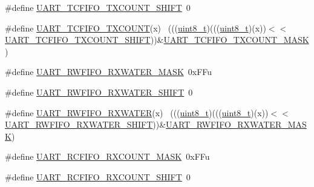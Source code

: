 \begin{DoxyCompactItemize}
\item 
\#define \hyperlink{group___u_a_r_t___register___masks_gaae504c1c6564913b0daeaf835defa8aa}{U\+A\+R\+T\+\_\+\+T\+C\+F\+I\+F\+O\+\_\+\+T\+X\+C\+O\+U\+N\+T\+\_\+\+S\+H\+I\+FT}~0
\item 
\#define \hyperlink{group___u_a_r_t___register___masks_ga127fff58218035fec1e2514fbf4aa920}{U\+A\+R\+T\+\_\+\+T\+C\+F\+I\+F\+O\+\_\+\+T\+X\+C\+O\+U\+NT}(x)                                  ~(((\hyperlink{_p_e___types_8h_aba7bc1797add20fe3efdf37ced1182c5}{uint8\+\_\+t})(((\hyperlink{_p_e___types_8h_aba7bc1797add20fe3efdf37ced1182c5}{uint8\+\_\+t})(x))$<$$<$\hyperlink{group___u_a_r_t___register___masks_gaae504c1c6564913b0daeaf835defa8aa}{U\+A\+R\+T\+\_\+\+T\+C\+F\+I\+F\+O\+\_\+\+T\+X\+C\+O\+U\+N\+T\+\_\+\+S\+H\+I\+FT}))\&\hyperlink{group___u_a_r_t___register___masks_gab3c6a27ca034de86ac2aa4f5c55781f2}{U\+A\+R\+T\+\_\+\+T\+C\+F\+I\+F\+O\+\_\+\+T\+X\+C\+O\+U\+N\+T\+\_\+\+M\+A\+SK})
\item 
\#define \hyperlink{group___u_a_r_t___register___masks_ga94cd69bba6b852fbd438b8b4b1ab1372}{U\+A\+R\+T\+\_\+\+R\+W\+F\+I\+F\+O\+\_\+\+R\+X\+W\+A\+T\+E\+R\+\_\+\+M\+A\+SK}~0x\+F\+Fu
\item 
\#define \hyperlink{group___u_a_r_t___register___masks_ga76a2717965f398da28aadbbebfafa2c8}{U\+A\+R\+T\+\_\+\+R\+W\+F\+I\+F\+O\+\_\+\+R\+X\+W\+A\+T\+E\+R\+\_\+\+S\+H\+I\+FT}~0
\item 
\#define \hyperlink{group___u_a_r_t___register___masks_ga3e9217bf32d7c1794d25f5ee42f5088b}{U\+A\+R\+T\+\_\+\+R\+W\+F\+I\+F\+O\+\_\+\+R\+X\+W\+A\+T\+ER}(x)                                  ~(((\hyperlink{_p_e___types_8h_aba7bc1797add20fe3efdf37ced1182c5}{uint8\+\_\+t})(((\hyperlink{_p_e___types_8h_aba7bc1797add20fe3efdf37ced1182c5}{uint8\+\_\+t})(x))$<$$<$\hyperlink{group___u_a_r_t___register___masks_ga76a2717965f398da28aadbbebfafa2c8}{U\+A\+R\+T\+\_\+\+R\+W\+F\+I\+F\+O\+\_\+\+R\+X\+W\+A\+T\+E\+R\+\_\+\+S\+H\+I\+FT}))\&\hyperlink{group___u_a_r_t___register___masks_ga94cd69bba6b852fbd438b8b4b1ab1372}{U\+A\+R\+T\+\_\+\+R\+W\+F\+I\+F\+O\+\_\+\+R\+X\+W\+A\+T\+E\+R\+\_\+\+M\+A\+SK})
\item 
\#define \hyperlink{group___u_a_r_t___register___masks_gad56c1815bb877b0a82dcabc58b780b54}{U\+A\+R\+T\+\_\+\+R\+C\+F\+I\+F\+O\+\_\+\+R\+X\+C\+O\+U\+N\+T\+\_\+\+M\+A\+SK}~0x\+F\+Fu
\item 
\#define \hyperlink{group___u_a_r_t___register___masks_gaf167fbdec63bf8287e0c1fa12ad7f39f}{U\+A\+R\+T\+\_\+\+R\+C\+F\+I\+F\+O\+\_\+\+R\+X\+C\+O\+U\+N\+T\+\_\+\+S\+H\+I\+FT}~0
\item 

\end{DoxyCompactItemize}
